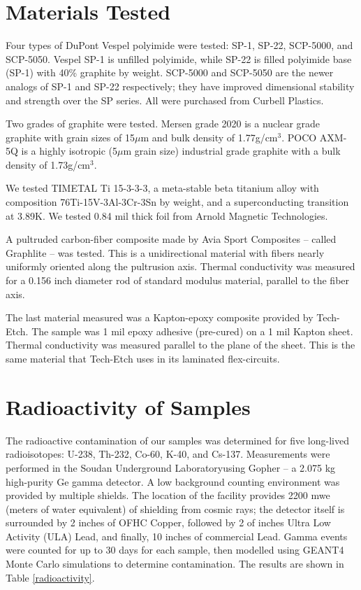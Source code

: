 \documentclass[final]{svjour2}
\begin{document}
\section{Materials Tested}
Four types of DuPont Vespel polyimide were tested: SP-1, SP-22, SCP-5000, and SCP-5050.  Vespel SP-1 is unfilled polyimide, while SP-22 is filled polyimide base (SP-1) with 40\% graphite by weight. SCP-5000 and SCP-5050 are the newer analogs of SP-1 and SP-22 respectively; they have improved dimensional stability and strength over the SP series. All were purchased from Curbell Plastics.

Two grades of graphite were tested. Mersen grade 2020 is a nuclear grade graphite with grain sizes of 15$\mu$m and bulk density of 1.77g/cm$^3$. POCO AXM-5Q is a highly isotropic (5$\mu$m grain size) industrial grade graphite with a bulk density of 1.73g/cm$^3$.

We tested TIMETAL Ti 15-3-3-3, a meta-stable beta titanium alloy with composition 76Ti-15V-3Al-3Cr-3Sn by weight, and a superconducting transition at 3.89K. We tested 0.84 mil thick foil from Arnold Magnetic Technologies.

A pultruded carbon-fiber composite made by Avia Sport Composites -- called Graphlite -- was tested. This is a unidirectional material with fibers nearly uniformly oriented along the pultrusion axis. Thermal conductivity was measured for a 0.156 inch diameter rod of standard modulus material, parallel to the fiber axis.

The last material measured was a Kapton-epoxy composite provided by Tech-Etch. The sample was 1 mil epoxy adhesive (pre-cured) on a 1 mil Kapton sheet. Thermal conductivity was measured parallel to the plane of the sheet. This is the same material that Tech-Etch uses in its laminated flex-circuits.

\section{Radioactivity of Samples}
The radioactive contamination of our samples was determined for five long-lived radioisotopes: U-238, Th-232, Co-60, K-40, and Cs-137. Measurements were performed in the Soudan Underground Laboratory\footnotemark using Gopher -- a 2.075 kg high-purity Ge gamma detector. A low background counting environment was provided by multiple shields. The location of the facility provides 2200 mwe (meters of water equivalent) of shielding from cosmic rays; the detector itself is surrounded by 2 inches of OFHC Copper, followed by 2 of inches Ultra Low Activity (ULA) Lead, and finally, 10 inches of commercial Lead. Gamma events were counted for up to 30 days for each sample, then modelled using GEANT4 Monte Carlo simulations to determine contamination. The results are shown in Table \ref{radioactivity}.
\end{document}
